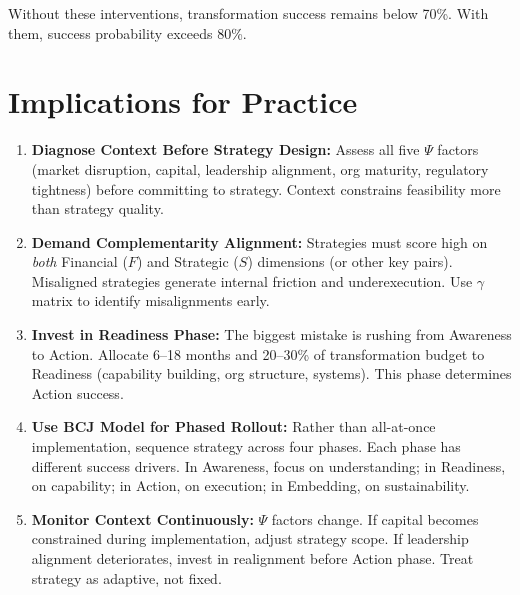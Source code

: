 Without these interventions, transformation success remains below 70\%. With them, success probability exceeds 80\%.

\section{Implications for Practice}
\label{sec:sdm-practice}

\begin{tcolorbox}[colback=green!5!white, colframe=green!75!black,
    title=Practical Implications for Strategy Design]

\begin{enumerate}

\item \textbf{Diagnose Context Before Strategy Design:} Assess all five $\Psi$ factors (market disruption, capital, leadership alignment, org maturity, regulatory tightness) before committing to strategy. Context constrains feasibility more than strategy quality.

\item \textbf{Demand Complementarity Alignment:} Strategies must score high on \textit{both} Financial ($F$) and Strategic ($S$) dimensions (or other key pairs). Misaligned strategies generate internal friction and underexecution. Use $\gamma$ matrix to identify misalignments early.

\item \textbf{Invest in Readiness Phase:} The biggest mistake is rushing from Awareness to Action. Allocate 6--18 months and 20--30\% of transformation budget to Readiness (capability building, org structure, systems). This phase determines Action success.

\item \textbf{Use BCJ Model for Phased Rollout:} Rather than all-at-once implementation, sequence strategy across four phases. Each phase has different success drivers. In Awareness, focus on understanding; in Readiness, on capability; in Action, on execution; in Embedding, on sustainability.

\item \textbf{Monitor Context Continuously:} $\Psi$ factors change. If capital becomes constrained during implementation, adjust strategy scope. If leadership alignment deteriorates, invest in realignment before Action phase. Treat strategy as adaptive, not fixed.

\end{enumerate}

\end{tcolorbox}

